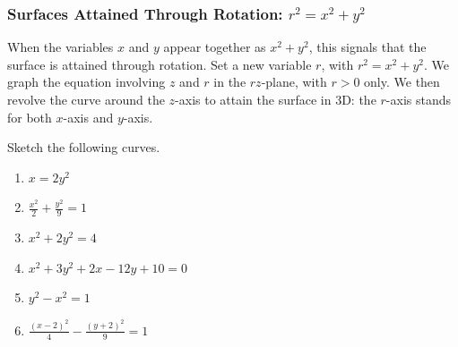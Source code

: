 \documentclass[11pt,fleqn]{book} %
\begin{document}
\subsubsection*{Surfaces Attained Through Rotation: $r^2 = x^2 + y^2$}

When the variables $x$ and $y$ appear together as $x^2 + y^2$, this signals that the surface is attained through rotation. Set a new variable $r$, with $r^2 = x^2 + y^2$. We graph the equation involving $z$ and $r$ in the $rz$-plane, with $r > 0$ only. We then revolve the curve around the $z$-axis to attain the surface in 3D: the $r$-axis stands for both $x$-axis and $y$-axis.

\begin{exercise}
    Sketch the following curves.

    \begin{minipage}[t]{0.45\linewidth} 
        \begin{enumerate}
            \item $x = 2y^2$
            \item $\frac{x^2}{2} + \frac{y^2}{9} = 1$
            \item $x^2 + 2y^2 = 4$
        \end{enumerate}
    \end{minipage}
    \begin{minipage}[t]{0.45\linewidth} 
        \begin{enumerate} \setcounter{enumi}{3}
            \item $x^2 + 3y^2 + 2x - 12y + 10 = 0$
            \item $y^2 - x^2 = 1$
            \item $\frac{(x - 2)^2}{4} - \frac{(y + 2)^2}{9} = 1$
        \end{enumerate}
    \end{minipage}
\end{exercise}
\end{document}

